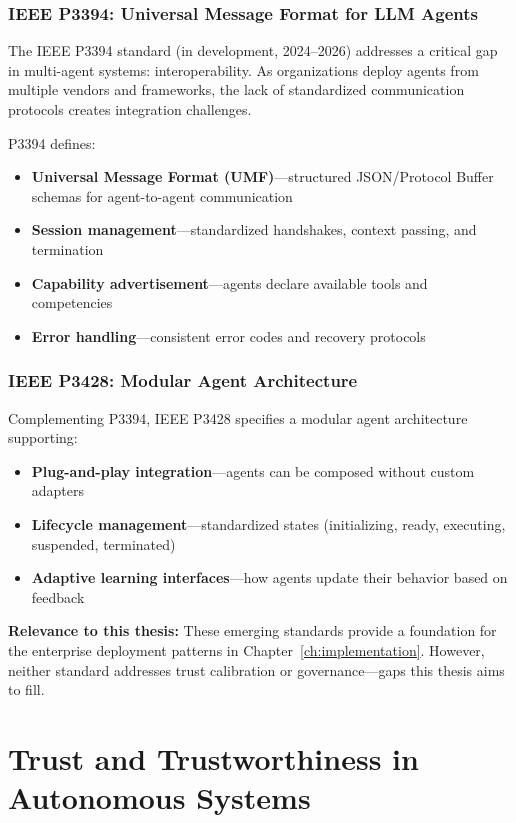 \subsubsection{IEEE P3394: Universal Message Format for LLM Agents}

The IEEE P3394 standard (in development, 2024--2026) addresses a critical gap in multi-agent systems: interoperability. As organizations deploy agents from multiple vendors and frameworks, the lack of standardized communication protocols creates integration challenges.

P3394 defines:
\begin{itemize}
    \item \textbf{Universal Message Format (UMF)}---structured JSON/Protocol Buffer schemas for agent-to-agent communication
    \item \textbf{Session management}---standardized handshakes, context passing, and termination
    \item \textbf{Capability advertisement}---agents declare available tools and competencies
    \item \textbf{Error handling}---consistent error codes and recovery protocols
\end{itemize}

\subsubsection{IEEE P3428: Modular Agent Architecture}

Complementing P3394, IEEE P3428 specifies a modular agent architecture supporting:
\begin{itemize}
    \item \textbf{Plug-and-play integration}---agents can be composed without custom adapters
    \item \textbf{Lifecycle management}---standardized states (initializing, ready, executing, suspended, terminated)
    \item \textbf{Adaptive learning interfaces}---how agents update their behavior based on feedback
\end{itemize}

\textbf{Relevance to this thesis:} These emerging standards provide a foundation for the enterprise deployment patterns in Chapter~\ref{ch:implementation}. However, neither standard addresses trust calibration or governance---gaps this thesis aims to fill.

\section{Trust and Trustworthiness in Autonomous Systems}
\label{sec:trust-theory}

